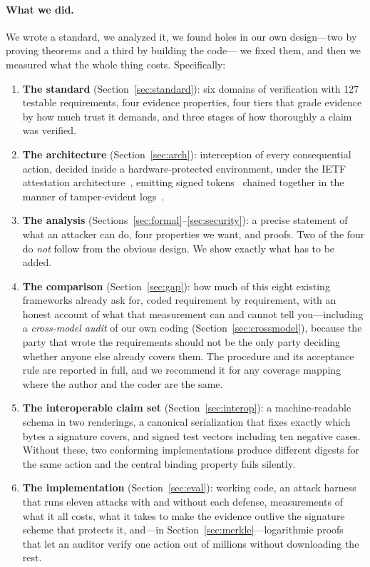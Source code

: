 \documentclass[11pt]{article}
\begin{document}
\paragraph{What we did.} We wrote a standard, we analyzed it, we found holes
in our own design---two by proving theorems and a third by building the code---
we fixed them, and then we measured what the whole thing costs. Specifically:

\begin{enumerate}[itemsep=1pt,topsep=2pt]
\item \textbf{The standard} (Section~\ref{sec:standard}): six domains of
verification with 127 testable requirements, four evidence properties, four
tiers that grade evidence by how much trust it demands, and three stages of
how thoroughly a claim was verified.
\item \textbf{The architecture} (Section~\ref{sec:arch}): interception of
every consequential action, decided inside a hardware-protected environment,
under the IETF attestation architecture~\cite{rfc9334}, emitting signed
tokens~\cite{rfc9711} chained together in the manner of tamper-evident
logs~\cite{merkle1987,crosby2009,rfc6962}.
\item \textbf{The analysis} (Sections~\ref{sec:formal}--\ref{sec:security}):
a precise statement of what an attacker can do, four properties we want, and
proofs. Two of the four do \emph{not} follow from the obvious design. We show
exactly what has to be added.
\item \textbf{The comparison} (Section~\ref{sec:gap}): how much of this eight
existing frameworks already ask for, coded requirement by requirement, with an
honest account of what that measurement can and cannot tell you---including a
\emph{cross-model audit} of our own coding
(Section~\ref{sec:crossmodel}), because the party that wrote the requirements
should not be the only party deciding whether anyone else already covers them.
The procedure and its acceptance rule are reported in full, and we recommend
it for any coverage mapping where the author and the coder are the same.
\item \textbf{The interoperable claim set} (Section~\ref{sec:interop}): a
machine-readable schema in two renderings, a canonical serialization that fixes
exactly which bytes a signature covers, and signed test vectors including ten
negative cases. Without these, two conforming implementations produce different
digests for the same action and the central binding property fails silently.
\item \textbf{The implementation} (Section~\ref{sec:eval}): working code, an
attack harness that runs eleven attacks with and without each defense,
measurements of what it all costs, what it takes to make the evidence outlive
the signature scheme that protects it, and---in
Section~\ref{sec:merkle}---logarithmic proofs that let an auditor verify one
action out of millions without downloading the rest.
\end{enumerate}
\end{document}
